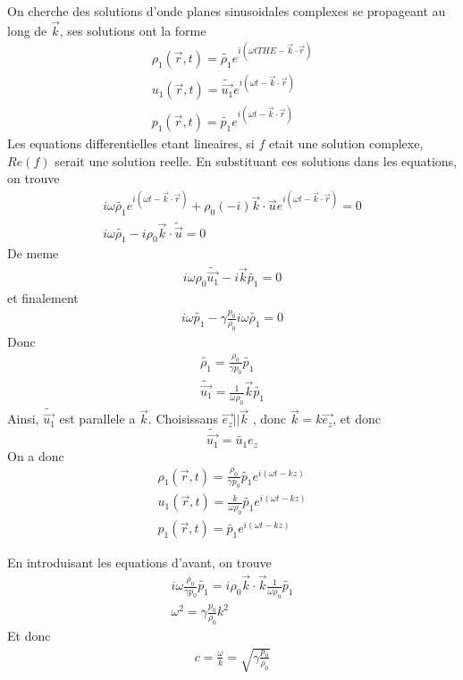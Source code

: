\documentclass[../main.tex]{subfiles}
\begin{document}
\begin{exemple}
On cherche des solutions d'onde planes sinusoidales complexes se propageant au long de $\vec{k}$, ses solutions ont la forme
\begin{align*}
	\rho_1( \vec{r},t ) = \tilde{  \rho_1 } e^{i ( \omega t THE- \vec{k} \cdot \vec{r}) } \\
	u_1( \vec{r},t)  = \tilde { \vec{u_1}  }e^{i( \omega t - \vec{k}\cdot \vec{r}) } \\
	p_1( \vec{r},t) = \tilde { p_1 } e^{i ( \omega t- \vec{k}\cdot \vec{r}) } 
\end{align*}
Les equations differentielles etant lineaires, si $f$ etait une solution complexe, $Re( f) $ serait une solution reelle.
En substituant ces solutions dans les equations, on trouve
\begin{align*}
	i \omega \tilde { \rho_1} e^{i( \omega t - \vec{k} \cdot \vec{r}) } + \rho_0 ( -i) \vec{k} \cdot \vec{u}  e^{i( \omega t - \vec{k}\cdot \vec{r}) }=0 \\
	i \omega \tilde { \rho_1} - i \rho_0 \vec{k}\cdot \tilde{ \vec{u} } =0
\end{align*}
De meme
\begin{align*}
i \omega \rho_0 \tilde { \vec{u_1}} - i \vec{k} \tilde { p_1} =0
\end{align*}
et finalement
\begin{align*}
	i \omega \tilde { p_1}  - \gamma \frac{p_0}{\rho_0} i \omega \tilde { \rho_1} =0
\end{align*}
Donc
\begin{align*}
\tilde { \rho_1} = \frac{\rho_0}{\gamma p_0} \tilde { p_1} \\
\tilde { \vec{u_1} } = \frac{1}{\omega \rho_0} \vec{k} \tilde { p_1} 
\end{align*}
Ainsi, $\tilde { \vec{u_1}} $ est parallele a $\vec{k}$.
Choisissans $\vec{e_z} || \vec{k}$ , donc $\vec{k} = k \vec{e_z}$, et donc
\[ 
\tilde { \vec{u_1}} = \tilde { u_1}  e_z
\]
On a donc
\begin{align*}
	\rho_1( \vec{r},t) = \frac{\rho_0}{\gamma p_0} \tilde { p_1}  e^{i( \omega t - kz) } \\
	u_1( \vec{r},t) = \frac{k}{\omega \rho_0} \tilde { p_1}  e^{i( \omega t -kz) } \\
	p_1( \vec{r},t) = \tilde { p_1}  e^{i ( \omega t -kz) } 
\end{align*}

En introduisant les equations d'avant, on trouve
\begin{align*}
i\omega \frac{\rho_0}{\gamma p_0}\tilde { p_1}  = i \rho_0 \vec{k}\cdot \vec{k} \frac{1}{\omega \rho_0} \tilde { p_1} \\
\omega^{2}= \gamma \frac{p_0}{\rho_0} k^{2}
\end{align*}
Et donc
\begin{align*}
c= \frac{\omega}{k}= \sqrt{ \gamma \frac{p_0}{\rho_0}} 
\end{align*}

\end{exemple}
\end{document}
